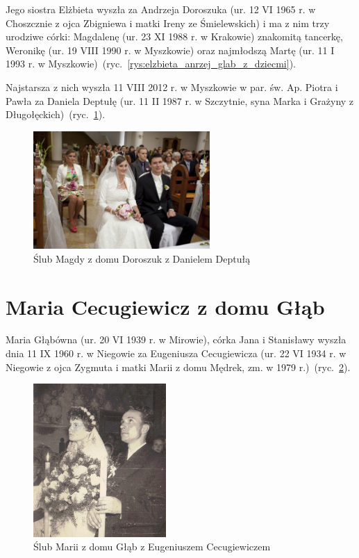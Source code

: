 Jego siostra Elżbieta wyszła za Andrzeja Doroszuka (ur. 12 VI 1965 r. w Choszcznie z ojca Zbigniewa i matki Ireny ze Śmielewskich) i ma z nim trzy urodziwe córki: Magdalenę (ur. 23 XI 1988 r. w Krakowie) znakomitą tancerkę, Weronikę (ur. 19 VIII 1990 r. w Myszkowie) oraz najmłodszą Martę (ur. 11 I 1993 r. w Myszkowie)~(ryc.~\ref{rys:elzbieta_anrzej_glab_z_dziecmi}).

Najstarsza z nich wyszła 11 VIII 2012 r. w Myszkowie w par. św. Ap. Piotra i Pawła za Daniela Deptułę (ur. 11 II 1987 r. w Szczytnie, syna Marka i Grażyny z Długołęckich)~(ryc.~\ref{rys:slub_magdy_i_daniela_deptulow}).


\begin{figure}[!h]
\begin{center}
\includegraphics[width=0.6\textwidth]{zdjecia/slub_magdy_i_daniela_deptulow.jpg}
\caption{Ślub Magdy z domu Doroszuk z Danielem Deptułą}
\label{rys:slub_magdy_i_daniela_deptulow}
\end{center}
\end{figure}


\section{Maria Cecugiewicz z domu Głąb}

Maria Głąbówna (ur. 20 VI 1939 r. w Mirowie), córka Jana i Stanisławy wyszła dnia 11 IX 1960 r. w Niegowie za Eugeniusza Cecugiewicza (ur. 22 VI 1934 r. w Niegowie z ojca Zygmuta i matki Marii z domu Mędrek, zm. w 1979 r.)~(ryc.~\ref{rys:slub_marii_i_eugeniusza_cecugiewiczow}).

\begin{figure}[!h]
\begin{center}
\includegraphics[width=0.45\textwidth]{zdjecia/slub_marii_i_eugeniusza_cecugiewiczow.jpg}
\caption{Ślub Marii z domu Głąb z Eugeniuszem Cecugiewiczem}
\label{rys:slub_marii_i_eugeniusza_cecugiewiczow}
\end{center}
\end{figure}

